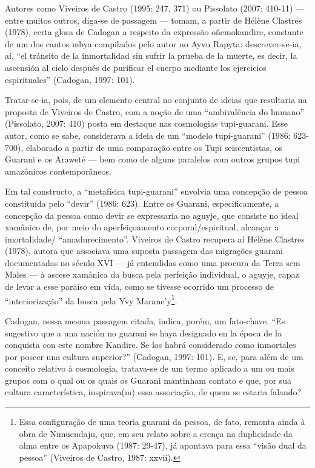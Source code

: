 \documentclass{article}
\begin{document}
Autores como Viveiros de Castro (1995: 247, 371) ou Pissolato (2007:
410-11) --- entre muitos outros, diga-se de passagem --- tomam, a
partir de H\'el\`ene Clastres (1978), certa glosa de Cadogan a respeito
da express\~ao o\~nemokandire, constante de um dos cantos mbya
compilados pelo autor no Ayvu Rapyta: descrever-se-ia, a\'i,
{\textquotedblleft}el tr\'ansito de la inmortalidad sin sufrir la
prueba de la muerte, es decir, la ascensi\'on al cielo despu\'es de
purificar el cuerpo mediante los ejercicios
espirituales{\textquotedblright} (Cadogan, 1997: 101). 

Tratar-se-ia, pois, de um elemento central no conjunto de ideias que
resultaria na proposta de Viveiros de Castro, com a no\c{c}\~ao de uma
{\textquotedblleft}ambival\^encia do humano{\textquotedblright}
(Pissolato, 2007: 410) posta em destaque nas cosmologias tupi-guarani.
Esse autor, como se sabe, considerava a ideia de um
{\textquotedblleft}modelo tupi-guarani{\textquotedblright} (1986:
623-700), elaborado a partir de uma compara\c{c}\~ao entre os Tupi
seiscentistas, os Guarani e os Arawet\'e --- bem como de alguns
paralelos com outros grupos tupi amaz\^onicos contempor\^aneos.

Em tal constructo, a {\textquotedblleft}metaf\'isica
tupi-guarani{\textquotedblright} envolvia uma concep\c{c}\~ao de pessoa
constitu\'ida pelo {\textquotedblleft}devir{\textquotedblright} (1986:
623). Entre os Guarani, especificamente, a concep\c{c}\~ao da pessoa
como devir se expressaria no aguyje, que consiste no ideal xam\^anico
de, por meio do aperfei\c{c}oamento corporal/espiritual, alcan\c{c}ar a
imortalidade/ {\textquotedblleft}amadurecimento{\textquotedblright}.
Viveiros de Castro recupera a\'i H\'el\`ene Clastres (1978), autora que
associava uma suposta passagem das migra\c{c}\~oes guarani documentadas
no s\'eculo XVI --- j\'a entendidas como uma procura da Terra sem Males
--- \`a ascese xam\^anica da busca pela perfei\c{c}\~ao individual, o
aguyje, capaz de levar a esse para\'iso em vida, como se tivesse
ocorrido um processo de
{\textquotedblleft}interioriza\c{c}\~ao{\textquotedblright} da busca
pela Yvy Marane{\textquoteright}y\footnote{ Essa configura\c{c}\~ao de
uma teoria guarani da pessoa, de fato, remonta ainda \`a obra de
Nimuendaju, que, em seu relato sobre a cren\c{c}a na duplicidade da
alma entre os Apapokuva (1987: 29-47), j\'a apontava para essa
{\textquotedblleft}vis\~ao dual da pessoa{\textquotedblright} (Viveiros
de Castro, 1987: xxvii).}.

Cadogan, nessa mesma passagem citada, indica, por\'em, um fato-chave.
{\textquotedblleft}Es sugestivo que a una naci\'on no guarani se haya
designado en la \'epoca de la conquista con este nombre Kandire. Se los
habr\'a considerado como inmortales por poseer una cultura
superior?{\textquotedblright} (Cadogan, 1997: 101). E, se, para al\'em
de um conceito relativo \`a cosmologia, tratava-se de um termo aplicado
a um ou mais grupos com o qual ou os quais os Guarani mantinham contato
e que, por sua cultura caracter\'istica, inspirava(m) essa
associa\c{c}\~ao, de quem se estaria falando?
\end{document}
